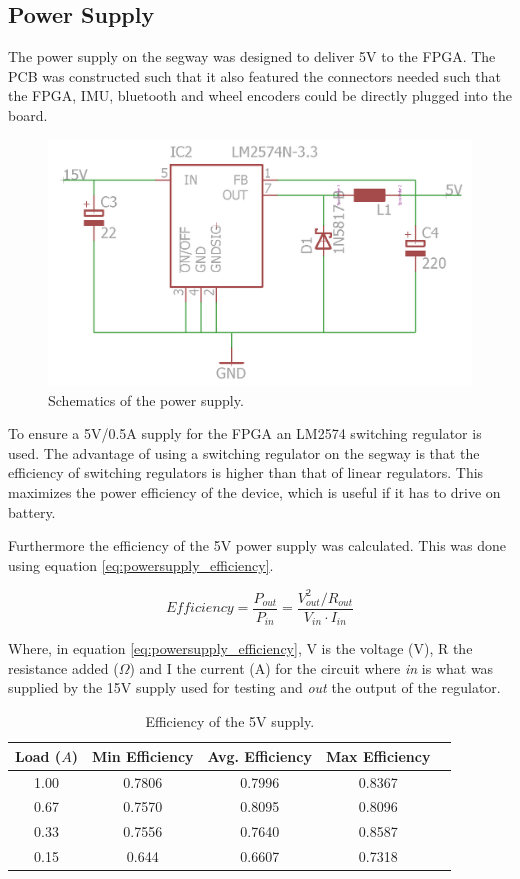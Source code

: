 
\subsection{Power Supply}
The power supply on the segway was designed to deliver 5V to the FPGA.
The PCB was constructed such that it also featured the connectors needed such that the FPGA, IMU, bluetooth and wheel encoders could be directly plugged into the board.


\begin{figure}[H]
\centering 
\includegraphics[width = 0.5 \textwidth]{images/powersupply}
\caption{Schematics of the power supply.}
\label{fig:powersupply_schematics}
\end{figure}

To ensure a 5V/0.5A supply for the FPGA an LM2574 switching regulator is used. 
The advantage of using a switching regulator on the segway is that the efficiency of switching regulators is higher than that of linear regulators.
This maximizes the power efficiency of the device, which is useful if it has to drive on battery.

Furthermore the efficiency of the 5V power supply was calculated.
This was done using equation \ref{eq:powersupply_efficiency}.

\begin{equation}
Efficiency = \frac{P_{out}}{P_{in}} = \frac{V_{out}^2 / R_{out}}{V_{in} \cdot I_{in}}
\label{eq:powersupply_efficiency}
\end{equation}

Where, in equation \ref{eq:powersupply_efficiency}, V is the voltage (V), R the resistance added ($\Omega$) and I the current (A) for the circuit where \textit{in} is what was supplied by the 15V supply used for testing and \textit{out} the output of the regulator.


\begin{table}[H]
\centering
\begin{tabular}{|c|c|c|c|c|}
\hline
Load ($A$) & Min Efficiency & Avg. Efficiency & Max Efficiency \\ \hline
1.00 & 0.7806 & 0.7996 & 0.8367 \\ \hline
0.67 & 0.7570 & 0.8095 & 0.8096 \\ \hline
0.33 & 0.7556 & 0.7640 & 0.8587 \\ \hline
0.15 & 0.644 & 0.6607 & 0.7318 \\ \hline
\end{tabular}
\caption{Efficiency of the 5V supply.}
\label{tab:voltageefficiency}
\end{table}

